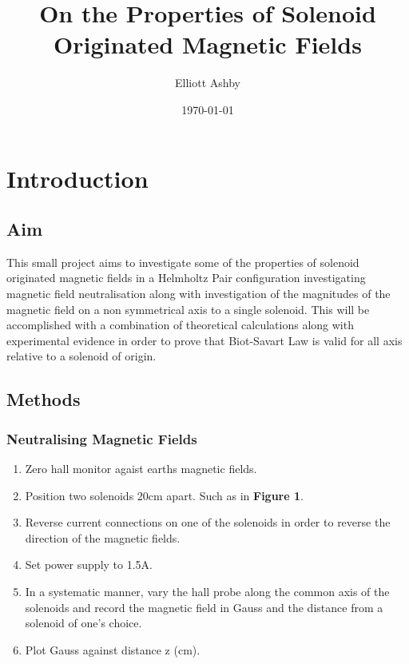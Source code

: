 \documentclass{article}
\title{On the Properties of Solenoid Originated Magnetic Fields}
\author{Elliott Ashby}
\date{\today}
\begin{document}
    \maketitle
    
    \section{Introduction}
    
    \subsection{Aim}
    This small project aims to investigate some of the properties of 
    solenoid originated magnetic fields in a Helmholtz Pair configuration investigating magnetic field neutralisation 
    along with investigation of the magnitudes of the magnetic field on a non symmetrical axis to a single solenoid.
    \newline This will be accomplished with a combination of theoretical 
    calculations along with experimental evidence in order to prove that Biot-Savart Law is valid for all axis relative to a solenoid of origin.
    \subsection{Methods}
    \subsubsection{Neutralising Magnetic Fields}
    \begin{enumerate}
        \item Zero hall monitor agaist earths magnetic fields.
        \item Position two solenoids 20cm apart. Such as in \textbf{Figure 1}.
        \item Reverse current connections on one of the solenoids in order to reverse the direction of the magnetic fields.
        \item Set power supply to 1.5A.
        \item In a systematic manner, vary the hall probe along the common axis of the solenoids and record the magnetic field in Gauss and the distance from a solenoid of one's choice.
        \item Plot Gauss against distance z (cm).
    \end{enumerate}
\end{document}
